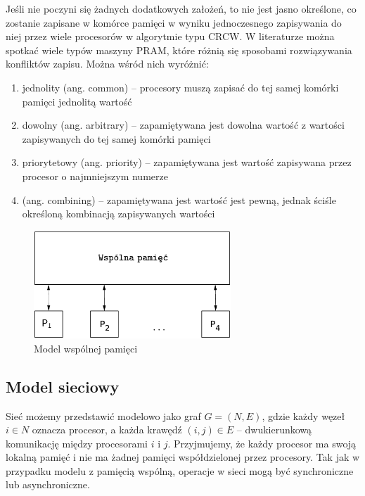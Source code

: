 Jeśli nie poczyni się żadnych dodatkowych założeń, to nie jest jasno określone, co zostanie zapisane w komórce pamięci w wyniku jednoczesnego zapisywania do niej przez wiele procesorów w algorytmie typu CRCW. W literaturze można spotkać wiele typów maszyny PRAM, które różnią się sposobami rozwiązywania konfliktów zapisu. Można wśród nich wyróżnić\cite{Cormen94}:

\begin{enumerate}
\item jednolity (ang. common) – procesory muszą zapisać do tej samej komórki pamięci jednolitą wartość
\item dowolny (ang. arbitrary) – zapamiętywana jest dowolna wartość z wartości zapisywanych do tej samej komórki pamięci
\item priorytetowy (ang. priority) – zapamiętywana jest wartość zapisywana przez procesor o najmniejszym numerze
\item (ang. combining) – zapamiętywana jest wartość jest pewną, jednak ściśle określoną kombinacją zapisywanych wartości
\end{enumerate}

\begin{figure}[h]
\centering
\includegraphics[width=20em]{./images/Rys4.eps}
\caption{Model wspólnej pamięci}
\label{fig:model_shared}
\end{figure}

\subsection{Model sieciowy}

Sieć możemy przedstawić modelowo jako graf \(G=(N,E)\), gdzie każdy węzeł \(i\in N\) oznacza procesor, a każda krawędź \((i, j) \in E\) – dwukierunkową komunikację między procesorami \(i\) i \(j\). Przyjmujemy, że każdy procesor ma swoją lokalną pamięć i nie ma żadnej pamięci współdzielonej przez procesory. Tak jak w przypadku modelu z pamięcią wspólną, operacje w sieci mogą być synchroniczne lub asynchroniczne.\\

